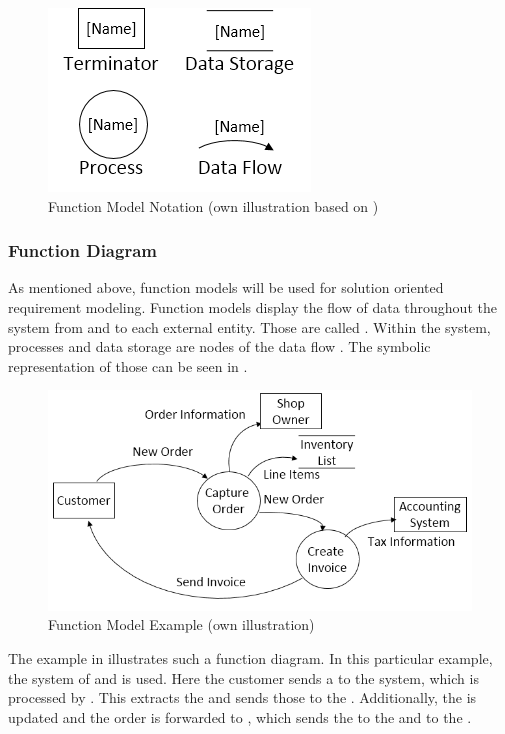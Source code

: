 \begin{figure}[H]
    \centering
    \includegraphics[scale=0.9]{img/fmSymb.png}
    \caption[Function Model Notation]{Function Model Notation (own illustration based on \cite[190]{Pohl.2007})}
    \label{fig:fmSymb}
\end{figure}


\subsubsection{Function Diagram}

As mentioned above, function models will be used for solution oriented requirement modeling. Function models display the flow of data throughout the system from and to each external entity. Those are called  \parencite[190]{Pohl.2007}. Within the system, processes and data storage are nodes of the data flow \parencite[cf.][190-191]{Pohl.2007}. The symbolic representation of those can be seen in .  

\begin{figure}[H]
    \centering
    \includegraphics{img/fmEx.png}
    \caption[Function Model Example]{Function Model Example (own illustration)}
    \label{fig:fmEx}
\end{figure}

The example in  illustrates such a function diagram. In this particular example, the system of  and  is used. Here the customer sends a  to the system, which is processed by . This extracts the  and sends those to the . Additionally, the  is updated and the order is forwarded to , which sends the  to the  and  to the .

